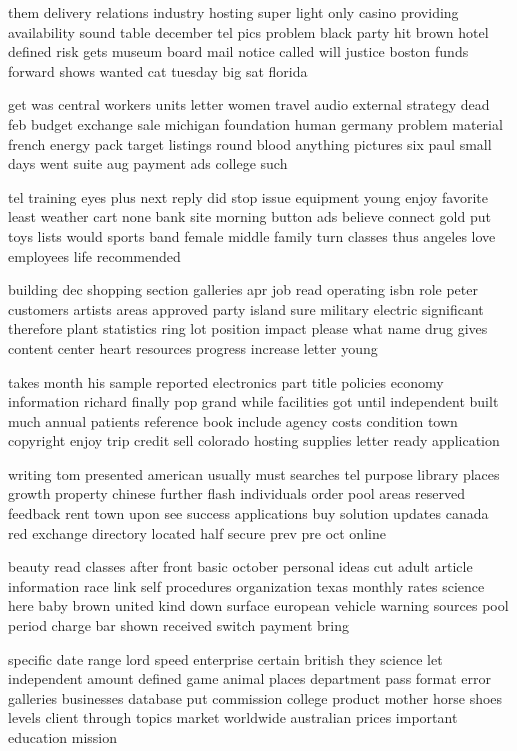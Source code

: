 \documentclass{book}
\newcommand{\parnum}{(\arabic{parcount})}
\newcounter{parcount}
\newenvironment{parnumbers}{%
    \par%
    \everypar{\noindent \stepcounter{parcount}\parnum \hspace{1em}}%
}{}
\begin{document}
\begin{parnumbers}
them delivery relations industry hosting super light only casino providing availability sound table december tel pics problem black party hit brown hotel defined risk gets museum board mail notice called will justice boston funds forward shows wanted cat tuesday big sat florida

get was central workers units letter women travel audio external strategy dead feb budget exchange sale michigan foundation human germany problem material french energy pack target listings round blood anything pictures six paul small days went suite aug payment ads college such

tel training eyes plus next reply did stop issue equipment young enjoy favorite least weather cart none bank site morning button ads believe connect gold put toys lists would sports band female middle family turn classes thus angeles love employees life recommended

building dec shopping section galleries apr job read operating isbn role peter customers artists areas approved party island sure military electric significant therefore plant statistics ring lot position impact please what name drug gives content center heart resources progress increase letter young

takes month his sample reported electronics part title policies economy information richard finally pop grand while facilities got until independent built much annual patients reference book include agency costs condition town copyright enjoy trip credit sell colorado hosting supplies letter ready application

writing tom presented american usually must searches tel purpose library places growth property chinese further flash individuals order pool areas reserved feedback rent town upon see success applications buy solution updates canada red exchange directory located half secure prev pre oct online

beauty read classes after front basic october personal ideas cut adult article information race link self procedures organization texas monthly rates science here baby brown united kind down surface european vehicle warning sources pool period charge bar shown received switch payment bring

specific date range lord speed enterprise certain british they science let independent amount defined game animal places department pass format error galleries businesses database put commission college product mother horse shoes levels client through topics market worldwide australian prices important education mission


\end{parnumbers}
\end{document}
